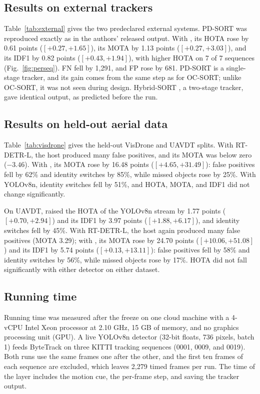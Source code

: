 \subsection{Results on external trackers}\label{sec:external}
Table~\ref{tab:external} gives the two predeclared external systems. PD-SORT
\cite{wang2025pdsort} was reproduced exactly as in the authors' released
output. With \scl{}, its HOTA rose by 0.61 points ($[+0.27,+1.65]$), its
MOTA by 1.13 points ($[+0.27,+3.03]$), and its IDF1 by 0.82 points
($[+0.43,+1.94]$), with higher HOTA on 7 of 7 sequences
(Fig.~\ref{fig:perseq}). FN fell by 1,291, and FP rose by 681. PD-SORT is a single-stage tracker, and its gain comes from the same
step as for OC-SORT; unlike OC-SORT, it was not seen during design.
Hybrid-SORT \cite{yang2024hybridsort}, a two-stage tracker, gave identical
output, as predicted before the run.



\subsection{Results on held-out aerial data}\label{sec:visdrone}
Table~\ref{tab:visdrone} gives the held-out VisDrone and UAVDT splits. With RT-DETR-L,
the host produced many false positives, and its MOTA was below zero
($-3.46$). With \scl{}, its MOTA rose by 16.48 points ($[+4.65,+31.49]$):
false positives fell by 62\% and identity switches by 85\%, while missed
objects rose by 25\%. With YOLOv8n, identity switches fell by 51\%, and HOTA,
MOTA, and IDF1 did not change significantly.

On UAVDT, \scl{} raised the HOTA of the YOLOv8n stream by 1.77 points
($[+0.70,+2.94]$) and its IDF1 by 3.97 points ($[+1.88,+6.17]$), and
identity switches fell by 45\%. With RT-DETR-L, the host again produced many
false positives (MOTA 3.29); with \scl{}, its MOTA rose by 24.70 points
($[+10.06,+51.08]$) and its IDF1 by 5.74 points ($[+0.13,+13.11]$): false
positives fell by 58\% and identity switches by 56\%, while missed objects
rose by 17\%. HOTA did not fall significantly with either detector on either
dataset.



\subsection{Running time}\label{sec:latency}
\label{sec:latency-setup}Running time was measured after the freeze on one cloud machine with a 4-vCPU
Intel Xeon processor at 2.10 GHz, 15 GB of memory, and no graphics processing unit (GPU). A live YOLOv8n
detector (32-bit floats, 736 pixels, batch 1) feeds ByteTrack on three KITTI
tracking sequences (0001, 0009, and 0019). Both runs use the same frames
one after the other, and the first ten frames of each sequence are excluded,
which leaves 2,279 timed frames per run. The time of the layer includes the
motion cue, the per-frame step, and saving the tracker output.

